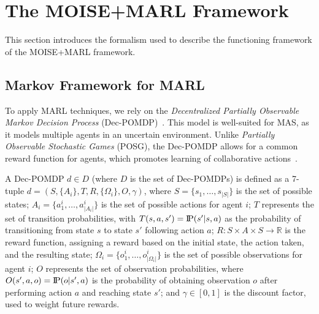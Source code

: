 \documentclass[sigconf,anonymous]{aamas}
\newcommand{\probP}{\text{I\kern-0.15em P}}
\begin{document}
\section{The MOISE+MARL Framework}
\label{sec:moise_marl_framework}

This section introduces the formalism used to describe the functioning framework of the MOISE+MARL framework.

\subsection{Markov Framework for MARL}

To apply MARL techniques, we rely on the \textit{Decentralized Partially Observable Markov Decision Process} (Dec-POMDP)~\citep{Oliehoek2016}. This model is well-suited for MAS, as it models multiple agents in an uncertain environment. Unlike \textit{Partially Observable Stochastic Games} (POSG), the Dec-POMDP allows for a common reward function for agents, which promotes learning of collaborative actions~\citep{Beynier2013}.

A Dec-POMDP $d \in D$ (where $D$ is the set of Dec-POMDPs) is defined as a 7-tuple $d = (S, \{A_i\}, T, R, \{\Omega_i\}, O, \gamma)$, where $S = \{s_1,\dots,s_{|S|}\}$ is the set of possible states; $A_{i} = \{a_{1}^{i},\dots,a_{|A_{i}|}^{i}\}$ is the set of possible actions for agent $i$; $T$ represents the set of transition probabilities, with $T(s,a,s') = \probP(s'|s,a)$ as the probability of transitioning from state $s$ to state $s'$ following action $a$; $R: S \times A \times S \rightarrow \mathbb{R}$ is the reward function, assigning a reward based on the initial state, the action taken, and the resulting state; $\Omega_{i} = \{o_{1}^{i},\dots,o_{|\Omega_{i}|}^{i}\}$ is the set of possible observations for agent $i$; $O$ represents the set of observation probabilities, where $O(s',a,o) = \probP(o|s',a)$ is the probability of obtaining observation $o$ after performing action $a$ and reaching state $s'$; and $\gamma \in [0,1]$ is the discount factor, used to weight future rewards.
\end{document}

